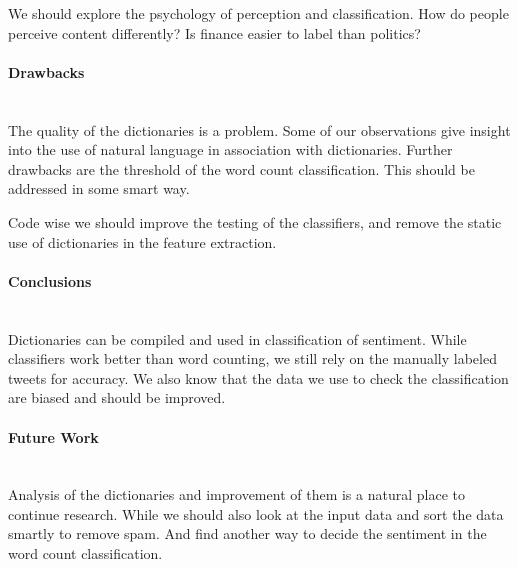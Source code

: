 We should explore the psychology of perception and classification. How do
people perceive content differently? Is finance easier to label than politics?

\paragraph{Drawbacks}
\hspace{0pt}\\
The quality of the dictionaries is a problem. Some of our observations give
insight into the use of natural language in association with dictionaries. 
Further drawbacks are the threshold of the word count classification. This
should be addressed in some smart way. 

Code wise we should improve the testing of the classifiers, and remove the
static use of dictionaries in the feature extraction.  

\paragraph{Conclusions}
\hspace{0pt}\\
Dictionaries can be compiled and used in classification of sentiment. While
classifiers work better than word counting, we still rely on the manually
labeled tweets for accuracy. We also know that the data we use
to check the classification are biased and should be improved. 

\paragraph{Future Work}
\hspace{0pt}\\
Analysis of the dictionaries and improvement of them is a natural place to
continue research. While we should also look at the input data and sort the data
smartly to remove spam. And find another way to decide the sentiment in the
word count classification. 
%
